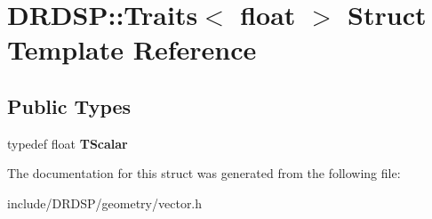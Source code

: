 \hypertarget{struct_d_r_d_s_p_1_1_traits_3_01float_01_4}{\section{D\-R\-D\-S\-P\-:\-:Traits$<$ float $>$ Struct Template Reference}
\label{struct_d_r_d_s_p_1_1_traits_3_01float_01_4}
}
\subsection*{Public Types}
\begin{DoxyCompactItemize}
\item 
\hypertarget{struct_d_r_d_s_p_1_1_traits_3_01float_01_4_a743d312f54b9ce220bf37be4f12a5b6a}{typedef float {\bfseries T\-Scalar}}\label{struct_d_r_d_s_p_1_1_traits_3_01float_01_4_a743d312f54b9ce220bf37be4f12a5b6a}

\end{DoxyCompactItemize}


The documentation for this struct was generated from the following file\-:\begin{DoxyCompactItemize}
\item 
include/\-D\-R\-D\-S\-P/geometry/vector.\-h\end{DoxyCompactItemize}
